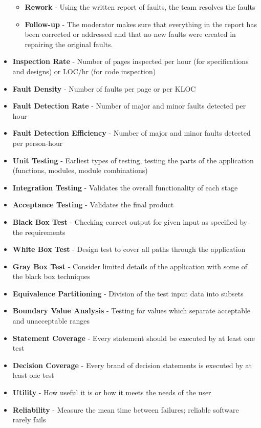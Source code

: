 \documentclass{report}
\begin{document}
\begin{itemize}
\begin{itemize}
				\item \textbf{Rework} - Using the written report of faults, the team resolves the faults
				\item \textbf{Follow-up} - The moderator makes sure that everything in the report has been corrected or addressed and that no new faults were created in repairing the original faults.
			\end{itemize}
		\item \textbf{Inspection Rate} - Number of pages inspected per hour (for specifications and designs) or LOC/hr (for code inspection)
		\item \textbf{Fault Density} - Number of faults per page or per KLOC
		\item \textbf{Fault Detection Rate} - Number of major and minor faults detected per hour
		\item \textbf{Fault Detection Efficiency} - Number of major and minor faults detected per person-hour
		\item \textbf{Unit Testing} - Earliest types of testing, testing the parts of the application (functions, modules, module combinations)
		\item \textbf{Integration Testing} - Validates the overall functionality of each stage
		\item \textbf{Acceptance Testing} - Validates the final product
		\item \textbf{Black Box Test} - Checking correct output for given input as specified by the requirements
		\item \textbf{White Box Test} - Design test to cover all paths through the application
		\item \textbf{Gray Box Test} - Consider limited details of the application with some of the black box techniques
		\item \textbf{Equivalence Partitioning} - Division of the test input data into subsets
		\item \textbf{Boundary Value Analysis} - Testing for values which separate acceptable and unacceptable ranges
		\item \textbf{Statement Coverage} - Every statement should be executed by at least one test
		\item \textbf{Decision Coverage} - Every brand of decision statements is executed by at least one test
		\item \textbf{Utility} - How useful it is or how it meets the needs of the user
		\item \textbf{Reliability} - Measure the mean time between failures; reliable software rarely fails

\end{itemize}
\end{document}
